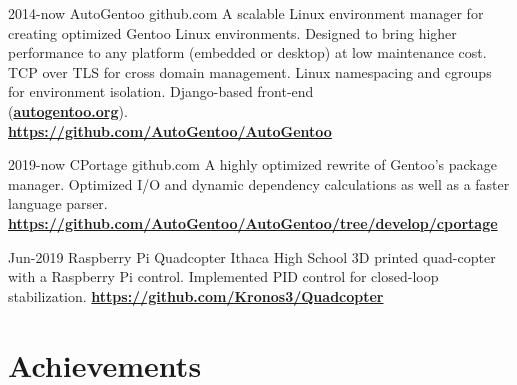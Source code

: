\documentclass[]{alternate}
\begin{document}
\begin{entrylist}
\entry
{2014-now}
{AutoGentoo }
{github.com}
{A scalable Linux environment manager for creating optimized Gentoo Linux environments. Designed to bring higher performance to any platform (embedded or desktop) at low maintenance cost. TCP over TLS for cross domain management. Linux namespacing and cgroups for environment isolation. Django-based front-end \\ (\textbf{\href{https://autogentoo.org}{autogentoo.org}}).\\
\textbf{\href{https://github.com/AutoGentoo/AutoGentoo}{https://github.com/AutoGentoo/AutoGentoo}}
}

\entry
{2019-now}
{CPortage}
{github.com}
{A highly optimized rewrite of Gentoo's package manager. Optimized I/O and dynamic dependency calculations as well as a faster language parser. \\\textbf{\href{https://github.com/AutoGentoo/AutoGentoo/tree/develop/cportage}{https://github.com/AutoGentoo/AutoGentoo/tree/develop/cportage}}
}

\entry
{Jun-2019}
{Raspberry Pi Quadcopter }
{Ithaca High School}
{3D printed quad-copter with a Raspberry Pi control. Implemented PID control for closed-loop stabilization. \textbf{\href{https://github.com/Kronos3/Quadcopter}{https://github.com/Kronos3/Quadcopter}} }
{\vspace{-0.3cm}}
\end{entrylist}

\pagebreak
\section{Achievements}
\end{document}
